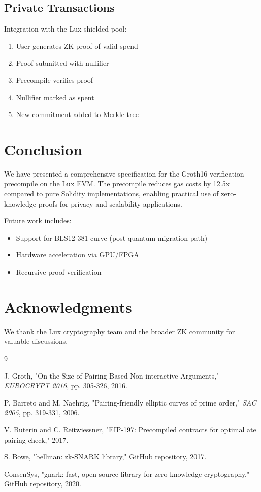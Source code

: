 \documentclass[11pt,a4paper]{article}
\theoremstyle{definition}
\begin{document}
\subsection{Private Transactions}

Integration with the Lux shielded pool:

\begin{enumerate}
    \item User generates ZK proof of valid spend
    \item Proof submitted with nullifier
    \item Precompile verifies proof
    \item Nullifier marked as spent
    \item New commitment added to Merkle tree
\end{enumerate}

\section{Conclusion}

We have presented a comprehensive specification for the Groth16 verification precompile on the Lux EVM. The precompile reduces gas costs by 12.5x compared to pure Solidity implementations, enabling practical use of zero-knowledge proofs for privacy and scalability applications.

Future work includes:
\begin{itemize}
    \item Support for BLS12-381 curve (post-quantum migration path)
    \item Hardware acceleration via GPU/FPGA
    \item Recursive proof verification
\end{itemize}

\section*{Acknowledgments}

We thank the Lux cryptography team and the broader ZK community for valuable discussions.

\begin{thebibliography}{9}

J. Groth, "On the Size of Pairing-Based Non-interactive Arguments," \textit{EUROCRYPT 2016}, pp. 305-326, 2016.

P. Barreto and M. Naehrig, "Pairing-friendly elliptic curves of prime order," \textit{SAC 2005}, pp. 319-331, 2006.

V. Buterin and C. Reitwiessner, "EIP-197: Precompiled contracts for optimal ate pairing check," 2017.

S. Bowe, "bellman: zk-SNARK library," GitHub repository, 2017.

ConsenSys, "gnark: fast, open source library for zero-knowledge cryptography," GitHub repository, 2020.

\end{thebibliography}
\end{document}
